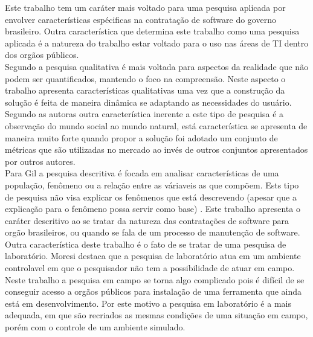 Este trabalho tem um caráter mais voltado para uma pesquisa aplicada por envolver características espécificas na contratação de software do governo brasileiro. Outra característica que determina este trabalho como uma pesquisa aplicada é a natureza do trabalho estar voltado para o uso nas áreas de TI dentro dos orgãos públicos.
\\Segundo \cite{tatiana_denise} a pesquisa qualitativa é mais voltada para aspectos da realidade que não podem ser quantificados, mantendo o foco na compreensão. Neste aspecto o trabalho apresenta características qualitativas uma vez que a construção da solução é feita de maneira dinâmica se adaptando as necessidades do usuário. Segundo as autoras outra característica inerente a este tipo de pesquisa é a observação do mundo social ao mundo natural, está característica se apresenta de maneira muito forte quando propor a solução foi adotado um conjunto de métricas que são utilizadas no mercado ao invés de outros conjuntos apresentados por outros autores. 
\\Para Gil \cite{gil_como_2002} a pesquisa descritiva é focada em analisar características de uma população, fenômeno ou a relação entre as váriaveis as que compõem. Ests tipo de pesquisa não visa explicar os fenômenos que está descrevendo (apesar que a explicação para o fenômeno possa servir como base) \cite{moresi_metodologia_2003}. Este trabalho apresenta o caráter descritivo ao se tratar da natureza das contratações de software para orgão brasileiros, ou quando se fala de um processo de manutenção de software.
\\Outra característica deste trabalho é o fato de se tratar de uma pesquisa 	de laboratório. Moresi destaca que a pesquisa de laboratório atua em um ambiente controlavel em que o pesquisador não tem a possibilidade de atuar em campo. Neste trabalho a pesquisa em campo se torna algo complicado pois é difícil de se conseguir acesso a orgãos públicos para instalação de uma ferramenta que ainda está em desenvolvimento. Por este motivo a pesquisa em laboratório é a mais adequada, em que são recriados as mesmas condições de uma situação em campo, porém com o controle de um ambiente simulado.

